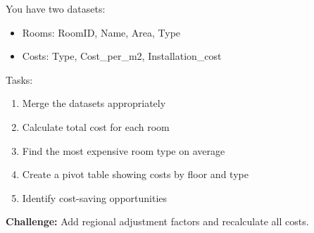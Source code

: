 \begin{tcolorbox}[
    title=Exercise 2: Cost Estimation,
    colframe=purple,
    colback=white,
    arc=2mm
]
You have two datasets:
\begin{itemize}
\item Rooms: RoomID, Name, Area, Type
\item Costs: Type, Cost\_per\_m2, Installation\_cost
\end{itemize}

Tasks:
\begin{enumerate}
\item Merge the datasets appropriately
\item Calculate total cost for each room
\item Find the most expensive room type on average
\item Create a pivot table showing costs by floor and type
\item Identify cost-saving opportunities
\end{enumerate}

\textbf{Challenge:} Add regional adjustment factors and recalculate all costs.
\end{tcolorbox}



